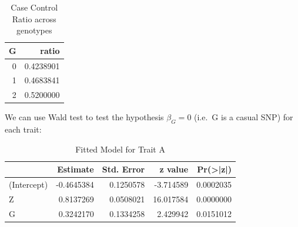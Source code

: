 \documentclass[
]{article}
\newenvironment{Shaded}{\begin{snugshade}}{\end{snugshade}}
\newcommand{\AttributeTok}[1]{\textcolor[rgb]{0.77,0.63,0.00}{#1}}
\newcommand{\DecValTok}[1]{\textcolor[rgb]{0.00,0.00,0.81}{#1}}
\newcommand{\DocumentationTok}[1]{\textcolor[rgb]{0.56,0.35,0.01}{\textbf{\textit{#1}}}}
\newcommand{\FunctionTok}[1]{\textcolor[rgb]{0.00,0.00,0.00}{#1}}
\newcommand{\NormalTok}[1]{#1}
\newcommand{\OtherTok}[1]{\textcolor[rgb]{0.56,0.35,0.01}{#1}}
\newcommand{\SpecialCharTok}[1]{\textcolor[rgb]{0.00,0.00,0.00}{#1}}
\newcommand{\StringTok}[1]{\textcolor[rgb]{0.31,0.60,0.02}{#1}}
\begin{document}
\begin{table}[H]

\caption{\label{tab:simulatedData}Case Control Ratio across genotypes}
\centering
\fontsize{10}{12}\selectfont
\begin{tabular}[t]{r|r}
\hline
G & ratio\\
\hline
0 & 0.4238901\\
\hline
1 & 0.4683841\\
\hline
2 & 0.5200000\\
\hline
\end{tabular}
\end{table}

We can use Wald test to test the hypothesis \(\beta_G = 0\) (i.e.~G is a
casual SNP) for each trait:

\begin{Shaded}
\end{Shaded}

\begin{table}[H]

\caption{\label{tab:unnamed-chunk-1}Fitted Model for Trait A}
\centering
\fontsize{10}{12}\selectfont
\begin{tabular}[t]{l|r|r|r|r}
\hline
  & Estimate & Std. Error & z value & Pr(>|z|)\\
\hline
(Intercept) & -0.4645384 & 0.1250578 & -3.714589 & 0.0002035\\
\hline
Z & 0.8137269 & 0.0508021 & 16.017584 & 0.0000000\\
\hline
G & 0.3242170 & 0.1334258 & 2.429942 & 0.0151012\\
\hline
\end{tabular}
\end{table}
\end{document}
